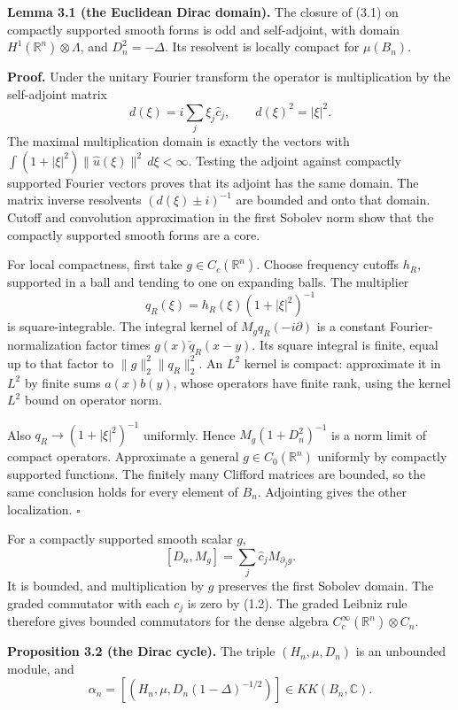 \documentclass[
  11pt,
]{article}
\begin{document}
\textbf{Lemma 3.1 (the Euclidean Dirac domain).} The closure of (3.1) on
compactly supported smooth forms is odd and self-adjoint, with domain
\(H^1(\mathbb R^n)\otimes\Lambda\), and \(D_n^2=-\Delta\). Its resolvent
is locally compact for \(\mu(B_n)\).

\textbf{Proof.} Under the unitary Fourier transform the operator is
multiplication by the self-adjoint matrix \[
d(\xi)=i\sum_j\xi_j\widehat c_j,\qquad
d(\xi)^2=|\xi|^2.
\] The maximal multiplication domain is exactly the vectors with
\(\int(1+|\xi|^2)\|\widehat u(\xi)\|^2\,d\xi<\infty\). Testing the
adjoint against compactly supported Fourier vectors proves that its
adjoint has the same domain. The matrix inverse resolvents
\((d(\xi)\pm i)^{-1}\) are bounded and onto that domain. Cutoff and
convolution approximation in the first Sobolev norm show that the
compactly supported smooth forms are a core.

For local compactness, first take \(g\in C_c(\mathbb R^n)\). Choose
frequency cutoffs \(h_R\), supported in a ball and tending to one on
expanding balls. The multiplier \[
q_R(\xi)=h_R(\xi)(1+|\xi|^2)^{-1}
\] is square-integrable. The integral kernel of \(M_gq_R(-i\partial)\)
is a constant Fourier-normalization factor times
\(g(x)\check q_R(x-y)\). Its square integral is finite, equal up to that
factor to \(\|g\|_2^2\|q_R\|_2^2\). An \(L^2\) kernel is compact:
approximate it in \(L^2\) by finite sums \(a(x)b(y)\), whose operators
have finite rank, using the kernel \(L^2\) bound on operator norm.

Also \(q_R\to(1+|\xi|^2)^{-1}\) uniformly. Hence \(M_g(1+D_n^2)^{-1}\)
is a norm limit of compact operators. Approximate a general
\(g\in C_0(\mathbb R^n)\) uniformly by compactly supported functions.
The finitely many Clifford matrices are bounded, so the same conclusion
holds for every element of \(B_n\). Adjointing gives the other
localization. \(\square\)

For a compactly supported smooth scalar \(g\), \[
[D_n,M_g]=\sum_j\widehat c_jM_{\partial_jg}.
\tag{3.2}
\] It is bounded, and multiplication by \(g\) preserves the first
Sobolev domain. The graded commutator with each \(c_j\) is zero by
(1.2). The graded Leibniz rule therefore gives bounded commutators for
the dense algebra \(C_c^\infty(\mathbb R^n)\widehat\otimes C_n\).

\textbf{Proposition 3.2 (the Dirac cycle).} The triple \((H_n,\mu,D_n)\)
is an unbounded module, and \[
\alpha_n=[(H_n,\mu,D_n(1-\Delta)^{-1/2})]
\in KK(B_n,\mathbb C).
\]
\end{document}
